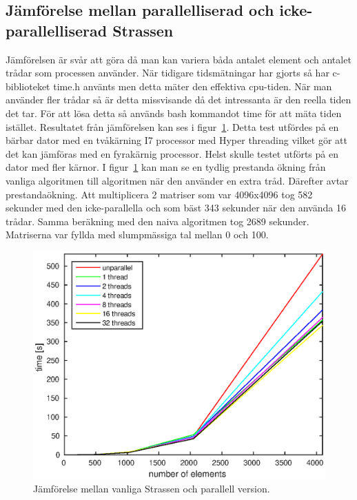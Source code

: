 \subsection{Jämförelse mellan parallelliserad och icke-parallelliserad Strassen}
Jämförelsen är svår att göra då man kan variera båda antalet element och antalet trådar som processen använder. När tidigare tidsmätningar har gjorts så har c-biblioteket time.h använts men detta mäter den effektiva cpu-tiden. När man använder fler trådar så är detta missvisande då det intressanta är den reella tiden det tar. För att lösa detta så används bash kommandot time för att mäta tiden istället. Resultatet från jämförelsen kan ses i figur~\ref{fig:threads}. Detta test utfördes på en bärbar dator med en tvåkärning I7 processor med Hyper threading vilket gör att det kan jämföras med en fyrakärnig processor. Helst skulle testet utförts på en dator med fler kärnor. I figur~\ref{fig:threads} kan man se en tydlig prestanda ökning från vanliga algoritmen till algoritmen när den använder en extra tråd. Därefter avtar prestandaökning. Att multiplicera 2 matriser som var 4096x4096 tog 582 sekunder med den icke-parallella och som bäst 343 sekunder när den använda 16 trådar. Samma beräkning med den naiva algoritmen tog 2689 sekunder. Matriserna var fyllda med slumpmässiga tal mellan 0 och 100. 

\begin{figure}[H]
	\begin{center}
		\includegraphics[scale=0.6]{martin-tex/threads_test.eps}
	\end{center}
	\caption{Jämförelse mellan vanliga Strassen och parallell version.}
	\label{fig:threads}
\end{figure}


